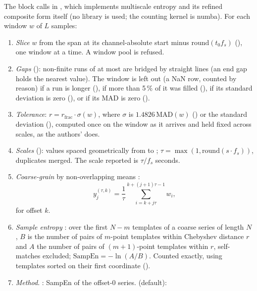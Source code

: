 The block calls  in ,
which implements multiscale entropy \citep{costa2005multiscale} and its refined composite
form \citep{wu2014analysis} itself (no library is used; the counting kernel is numba). For
each window $w$ of $L$ samples:
\begin{enumerate}
\item \emph{Slice} $w$ from the span at its channel-absolute start minus
  $\mathrm{round}(t_0 f_s)$ (), one window at a time. A window
  pool is refused.
\item \emph{Gaps} (): non-finite runs of at most  are bridged
  by straight lines (an end gap holds the nearest value). The window is left out (a NaN row,
  counted by reason) if a run is longer (), if more than 5\,\% of it was
  filled (), if its standard deviation is zero (), or if its
  MAD is zero ().
\item \emph{Tolerance}: $r = r_{\mathrm{frac}} \cdot \sigma(w)$, where $\sigma$ is
  $1.4826\,\mathrm{MAD}(w)$ () or the standard deviation (),
  computed once on the window as it arrives and held fixed across scales, as the authors'
   does.
\item \emph{Scales} ():  values spaced geometrically from
   to ; $\tau = \max(1, \mathrm{round}(s \cdot f_s))$,
  duplicates merged. The scale reported is $\tau / f_s$ seconds.
\item \emph{Coarse-grain} by non-overlapping means \citep[eq.~16]{costa2005multiscale}:
  \[ y^{(\tau,k)}_j = \frac{1}{\tau} \sum_{i = k + j\tau}^{k + (j+1)\tau - 1} w_i , \]
  for offset $k$.
\item \emph{Sample entropy} \citep{richman2000physiological}: over the first $N-m$ templates
  of a coarse series of length $N$, $B$ is the number of pairs of $m$-point templates within
  Chebyshev distance $r$ and $A$ the number of pairs of $(m+1)$-point templates within $r$,
  self-matches excluded; $\mathrm{SampEn} = -\ln(A/B)$. Counted exactly, using templates
  sorted on their first coordinate ().
\item \emph{Method}. : SampEn of the offset-0 series.  (default):

\end{enumerate}
